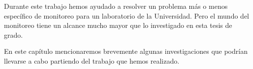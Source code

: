 Durante este trabajo hemos ayudado a resolver un problema más o menos
específico de monitoreo para un laboratorio de la Universidad. Pero el mundo
del monitoreo tiene un alcance mucho mayor que lo investigado en esta tesis de
grado.

En este capítulo mencionaremos brevemente algunas investigaciones que podrían
llevarse a cabo partiendo del trabajo que hemos realizado.
